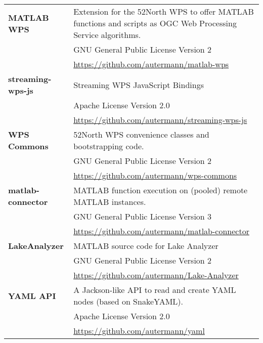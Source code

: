 \documentclass[english,
               paper=a4,
               fontsize=11pt,
               bibliography=totoc,
               listof=nochaptergap,
               listof=notoc,
               numbers=noendperiod,
               parskip=half,
               footnotes=multiple,
               toc=numberline,
               captions=tableheading,
               DIV=10,
              ]{scrreprt}
\newcommand{\ftn}{52\textdegree{}North\xspace}
\begin{document}
\begin{appendix}
\begin{center}
\begin{small}
\begin{tabularx}{\linewidth}{@{}lX@{}}
            \textbf{MATLAB WPS}
            & Extension for the \ftn WPS to offer MATLAB functions and scripts as OGC Web Processing Service algorithms.\\
            & GNU General Public License Version 2\\
            & \url{https://github.com/autermann/matlab-wps}\\
            \cmidrule(r){1-1}
            \cmidrule(l){2-2}

            \textbf{streaming-wps-js}
            & Streaming WPS JavaScript Bindings\\
            & Apache License Version 2.0\\
            & \url{https://github.com/autermann/streaming-wps-js}\\
            \cmidrule(r){1-1}
            \cmidrule(l){2-2}

            \textbf{WPS Commons}
            & \ftn WPS convenience classes and bootstrapping code.\\
            & GNU General Public License Version 2\\
            & \url{https://github.com/autermann/wps-commons}\\
            \cmidrule(r){1-1}
            \cmidrule(l){2-2}

            \textbf{matlab-connector}
            & MATLAB function execution on (pooled) remote MATLAB instances.\\
            & GNU General Public License Version 3\\
            & \url{https://github.com/autermann/matlab-connector}\\
            \cmidrule(r){1-1}
            \cmidrule(l){2-2}

            \textbf{LakeAnalyzer}
            & MATLAB source code for Lake Analyzer\\
            & GNU General Public License Version 2\\
            & \url{https://github.com/autermann/Lake-Analyzer}\\
            \cmidrule(r){1-1}
            \cmidrule(l){2-2}

            \textbf{YAML API}
            & A Jackson-like API to read and create YAML nodes (based on SnakeYAML).\\
            & Apache License Version 2.0\\
            & \url{https://github.com/autermann/yaml}\\
            \bottomrule
          \end{tabularx}
        \end{small}
      \end{center}



\end{appendix}
\end{document}
